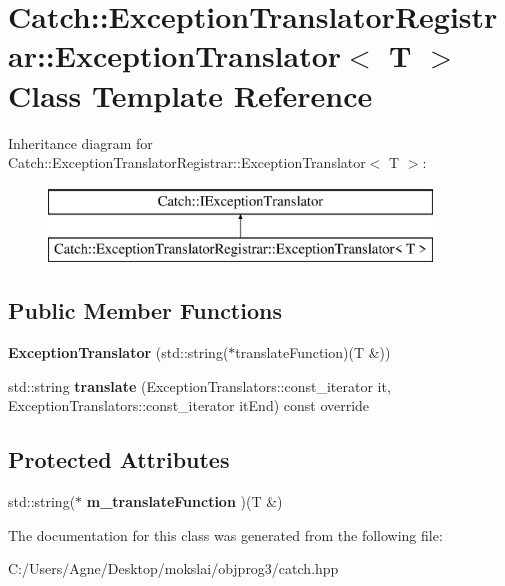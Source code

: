 \hypertarget{class_catch_1_1_exception_translator_registrar_1_1_exception_translator}{}\section{Catch\+:\+:Exception\+Translator\+Registrar\+:\+:Exception\+Translator$<$ T $>$ Class Template Reference}
\label{class_catch_1_1_exception_translator_registrar_1_1_exception_translator}
Inheritance diagram for Catch\+:\+:Exception\+Translator\+Registrar\+:\+:Exception\+Translator$<$ T $>$\+:\begin{figure}[H]
\begin{center}
\leavevmode
\includegraphics[height=2.000000cm]{class_catch_1_1_exception_translator_registrar_1_1_exception_translator}
\end{center}
\end{figure}
\subsection*{Public Member Functions}
\begin{DoxyCompactItemize}
\item 
\mbox{\label{class_catch_1_1_exception_translator_registrar_1_1_exception_translator_a2de4e9bcaad47996159763e69f614d7a}} 
{\bfseries Exception\+Translator} (std\+::string($\ast$translate\+Function)(T \&))
\item 
\mbox{\label{class_catch_1_1_exception_translator_registrar_1_1_exception_translator_a29e85940ee9ce719f26e43550cb4ed48}} 
std\+::string {\bfseries translate} (Exception\+Translators\+::const\+\_\+iterator it, Exception\+Translators\+::const\+\_\+iterator it\+End) const override
\end{DoxyCompactItemize}
\subsection*{Protected Attributes}
\begin{DoxyCompactItemize}
\item 
\mbox{\label{class_catch_1_1_exception_translator_registrar_1_1_exception_translator_a488013ff0869785c9d041443fbf9a757}} 
std\+::string($\ast$ {\bfseries m\+\_\+translate\+Function} )(T \&)
\end{DoxyCompactItemize}


The documentation for this class was generated from the following file\+:\begin{DoxyCompactItemize}
\item 
C\+:/\+Users/\+Agne/\+Desktop/mokslai/objprog3/catch.\+hpp\end{DoxyCompactItemize}

